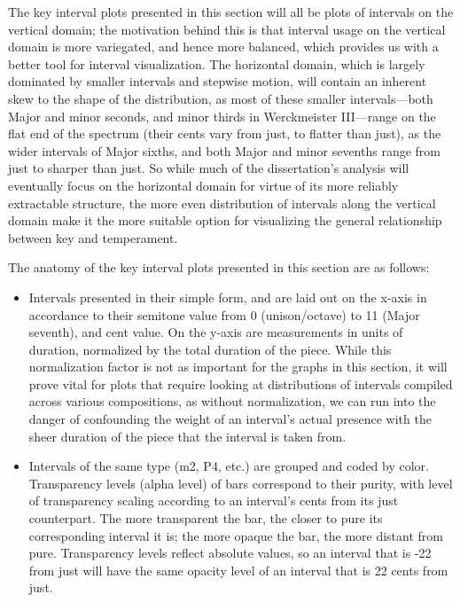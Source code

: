 The key interval plots presented in this section will all be plots of
intervals on the vertical domain; the motivation behind this is that
interval usage on the vertical domain is more variegated, and hence more
balanced, which provides us with a better tool for interval
visualization. The horizontal domain, which is largely dominated by
smaller intervals and stepwise motion, will contain an inherent skew to
the shape of the distribution, as most of these smaller
intervals---both Major and minor seconds, and minor thirds in
Werckmeister III---range on the flat end of the spectrum (their
cents vary from just, to flatter than just), as the wider intervals of
Major sixths, and both Major and minor sevenths range from just to
sharper than just. So while much of the dissertation's analysis will
eventually focus on the horizontal domain for virtue of its more
reliably extractable structure, the more even distribution of intervals
along the vertical domain make it the more suitable option for
visualizing the general relationship between key and temperament.

The anatomy of the key interval plots presented in this section are as
follows:

\begin{itemize}
\tightlist
\item
  Intervals presented in their simple form, and are laid out on the
  x-axis in accordance to their semitone value from 0 (unison/octave) to
  11 (Major seventh), and cent value. On the y-axis are measurements in
  units of duration, normalized by the total duration of the piece.
  While this normalization factor is not as important for the graphs in
  this section, it will prove vital for plots that require looking at
  distributions of intervals compiled across various compositions, as
  without normalization, we can run into the danger of confounding the
  weight of an interval's actual presence with the sheer duration of the
  piece that the interval is taken from.
\item
  Intervals of the same type (m2, P4, etc.) are grouped and coded by
  color. Transparency levels (alpha level) of bars correspond to their
  purity, with level of transparency scaling according to an interval's
  cents from its just counterpart. The more transparent the bar, the
  closer to pure its corresponding interval it is; the more opaque the
  bar, the more distant from pure. Transparency levels reflect absolute
  values, so an interval that is -22 from just will have the same
  opacity level of an interval that is 22 cents from just.
\end{itemize}

